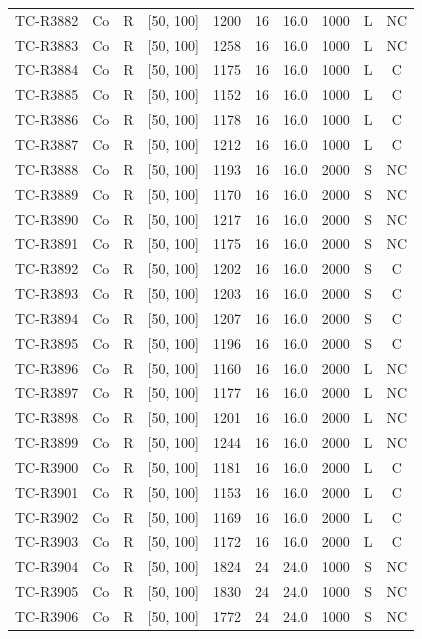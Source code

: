 \begin{longtable}{lccccccccc}
TC-R3882 & Co & R & [50, 100] & 1200 & 16 & 16.0 & 1000 & L & NC \\
TC-R3883 & Co & R & [50, 100] & 1258 & 16 & 16.0 & 1000 & L & NC \\
TC-R3884 & Co & R & [50, 100] & 1175 & 16 & 16.0 & 1000 & L & C \\
TC-R3885 & Co & R & [50, 100] & 1152 & 16 & 16.0 & 1000 & L & C \\
TC-R3886 & Co & R & [50, 100] & 1178 & 16 & 16.0 & 1000 & L & C \\
TC-R3887 & Co & R & [50, 100] & 1212 & 16 & 16.0 & 1000 & L & C \\
TC-R3888 & Co & R & [50, 100] & 1193 & 16 & 16.0 & 2000 & S & NC \\
TC-R3889 & Co & R & [50, 100] & 1170 & 16 & 16.0 & 2000 & S & NC \\
TC-R3890 & Co & R & [50, 100] & 1217 & 16 & 16.0 & 2000 & S & NC \\
TC-R3891 & Co & R & [50, 100] & 1175 & 16 & 16.0 & 2000 & S & NC \\
TC-R3892 & Co & R & [50, 100] & 1202 & 16 & 16.0 & 2000 & S & C \\
TC-R3893 & Co & R & [50, 100] & 1203 & 16 & 16.0 & 2000 & S & C \\
TC-R3894 & Co & R & [50, 100] & 1207 & 16 & 16.0 & 2000 & S & C \\
TC-R3895 & Co & R & [50, 100] & 1196 & 16 & 16.0 & 2000 & S & C \\
TC-R3896 & Co & R & [50, 100] & 1160 & 16 & 16.0 & 2000 & L & NC \\
TC-R3897 & Co & R & [50, 100] & 1177 & 16 & 16.0 & 2000 & L & NC \\
TC-R3898 & Co & R & [50, 100] & 1201 & 16 & 16.0 & 2000 & L & NC \\
TC-R3899 & Co & R & [50, 100] & 1244 & 16 & 16.0 & 2000 & L & NC \\
TC-R3900 & Co & R & [50, 100] & 1181 & 16 & 16.0 & 2000 & L & C \\
TC-R3901 & Co & R & [50, 100] & 1153 & 16 & 16.0 & 2000 & L & C \\
TC-R3902 & Co & R & [50, 100] & 1169 & 16 & 16.0 & 2000 & L & C \\
TC-R3903 & Co & R & [50, 100] & 1172 & 16 & 16.0 & 2000 & L & C \\
TC-R3904 & Co & R & [50, 100] & 1824 & 24 & 24.0 & 1000 & S & NC \\
TC-R3905 & Co & R & [50, 100] & 1830 & 24 & 24.0 & 1000 & S & NC \\
TC-R3906 & Co & R & [50, 100] & 1772 & 24 & 24.0 & 1000 & S & NC \\

\end{longtable}
